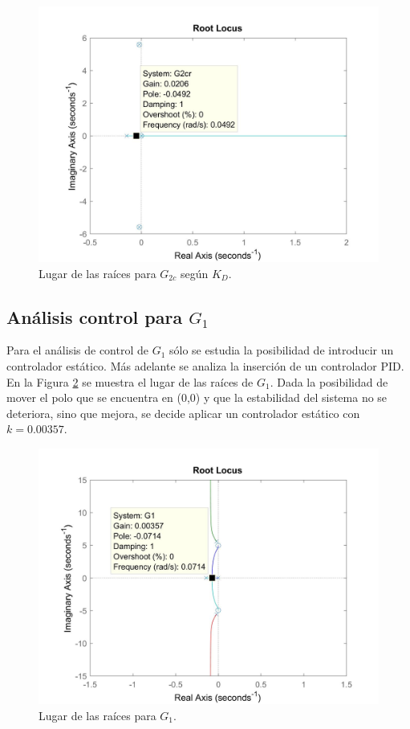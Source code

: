 \documentclass[journal]{IEEEtran}
\begin{document}
\begin{figure}[h!]
\caption{Lugar de las raíces para $G_{2c}$ según $K_D$.\label{fig:rlocusG2PID}}
  \centering
\includegraphics[scale=0.18]{control/PID_G2.jpg}
\end{figure}

\subsection{Análisis control para $G_1$}
Para el análisis de control de $G_1$ sólo se estudia la posibilidad de introducir un controlador estático. Más adelante se analiza la inserción de un controlador PID. En la Figura \ref{fig:rlocusG1} se muestra el lugar de las raíces de $G_1$. Dada la posibilidad de mover el polo que se encuentra en (0,0) y que la estabilidad del sistema no se deteriora, sino que mejora, se decide aplicar un controlador estático con $k=0.00357$.\\   

\begin{figure}[h!]
\caption{Lugar de las raíces para $G_1$.\label{fig:rlocusG1}}
  \centering
\includegraphics[scale=0.18]{control/k_G1.jpg}
\end{figure}
\end{document}
